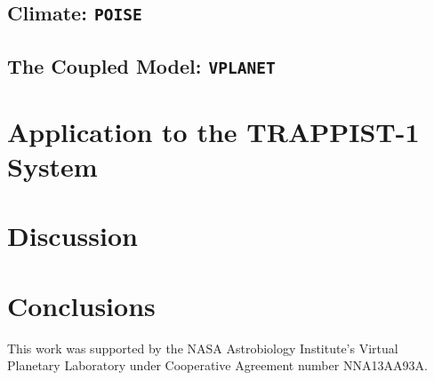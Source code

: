 \documentclass[preprint,12pt]{aastex}
\def\vplanet{\texttt{VPLANET}}
\def\poise{\texttt{POISE}}
\begin{document}

\subsection{Climate: \poise}


\subsection{The Coupled Model: \vplanet}


\section{Application to the TRAPPIST-1 System\label{sec:trappist}}

\section{Discussion\label{sec:discussion}}

\section{Conclusions\label{sec:conclusions}}

\vspace{1cm}
This work was supported by the NASA Astrobiology Institute's Virtual
Planetary Laboratory under Cooperative Agreement number NNA13AA93A.
\end{document}
